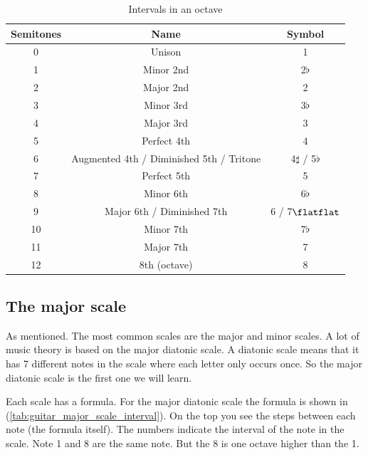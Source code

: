 \begin{table}[h]
	\centering
	\begin{tabular}{|c|c|c|}
		\hline
		\textbf{Semitones} & \textbf{Name} & \textbf{Symbol} \\
		\hline
		\hline
		0 & Unison & 1 \\
		\hline
		1 & Minor 2nd & 2$\flat$ \\
		\hline
		2 & Major 2nd & 2 \\
		\hline
		3 & Minor 3rd & 3$\flat$ \\
		\hline
		4 & Major 3rd & 3 \\
		\hline
		5 & Perfect 4th& 4 \\
		\hline
		6 & Augmented 4th / Diminished 5th / Tritone & 4$\sharp$ / 5$\flat$ \\
		\hline
		7 & Perfect 5th & 5 \\
		\hline
		8 & Minor 6th & 6$\flat$ \\
		\hline
		9 & Major 6th / Diminished 7th & 6 / 7$\flatflat$ \\
		\hline
		10 & Minor 7th & 7$\flat$ \\
		\hline
		11 & Major 7th & 7 \\
		\hline
		12 & 8th (octave)& 8 \\
		\hline
	\end{tabular}
	\caption{Intervals in an octave}
	\label{tab:guitar_intervals_in_octave}
\end{table}

\newpage

\subsection{The major scale}

As mentioned. The most common scales are the major and minor scales. A lot of music theory is based on the major diatonic scale. A diatonic scale means that it has 7 different notes in the scale where each letter only occurs once. So the major diatonic scale is the first one we will learn.

Each scale has a formula. For the major diatonic scale the formula is shown in (\autoref{tab:guitar_major_scale_interval}). On the top you see the steps between each note (the formula itself). The numbers indicate the interval of the note in the scale. Note 1 and 8 are the same note. But the 8 is one octave higher than the 1.

